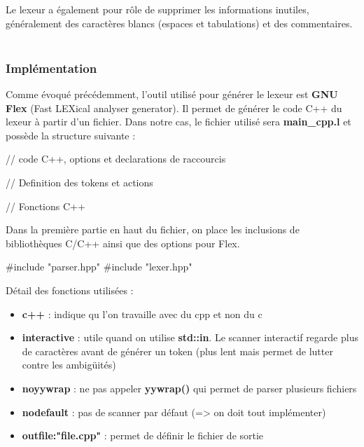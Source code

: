 \documentclass[a4paper]{article}%
\begin{document}
Le lexeur a également pour rôle de supprimer les informations inutiles,
généralement des caractères blancs (espaces et tabulations) et des
commentaires.\\~\\

\subsubsection*{Implémentation}

Comme évoqué précédemment, l'outil utilisé pour générer le lexeur est
\textbf{GNU Flex} (Fast LEXical analyser generator). Il permet de générer le
code C++ du lexeur à partir d'un fichier. Dans notre cas, le fichier utilisé
sera \textbf{main\_cpp.l} et possède la structure suivante
\cite{compilerFlexBison} :

\begin{code}
// code C++, options et declarations de raccourcis

// Definition des tokens et actions

// Fonctions C++
\end{code}\leavevmode\newline

\noindent

Dans la première partie en haut du fichier, on place les inclusions de
bibliothèques C/C++ ainsi que des options pour Flex.

\begin{code}
#include "parser.hpp"
#include "lexer.hpp"

\end{code}\leavevmode\newline

Détail des fonctions utilisées :
\begin{itemize}
  \item \textbf{c++} : indique qu l'on travaille avec du cpp et non du c
  \item \textbf{interactive} : utile quand on utilise \textbf{std::in}. Le
    scanner interactif regarde plus de caractères avant de générer un token
    (plus lent mais permet de lutter contre les ambigüités)
  \item \textbf{noyywrap} : ne pas appeler \textbf{yywrap()} qui permet de
    parser plusieurs fichiers
  \item \textbf{nodefault} : pas de scanner par défaut (=> on doit tout
    implémenter)
  \item \textbf{outfile:"file.cpp"} : permet de définir le fichier de sortie
\end{itemize}\leavevmode\\
\end{document}
